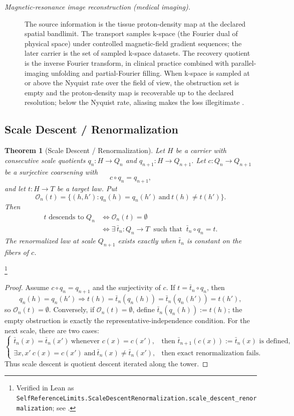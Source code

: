 \documentclass[11pt]{article}
\newtheorem{theorem}{Theorem}[section]
\theoremstyle{definition}
\begin{document}
\begin{description}
\item[\emph{Magnetic-resonance image reconstruction
(medical imaging).}]
The source information is the tissue proton-density
map at the declared spatial bandlimit.  The transport
samples k-space (the Fourier dual of physical space)
under controlled magnetic-field gradient sequences;
the later carrier is the set of sampled k-space
datasets.  The recovery quotient is the inverse
Fourier transform, in clinical practice combined with
parallel-imaging unfolding and partial-Fourier
filling.  When k-space is sampled at or above the
Nyquist rate over the field of view, the obstruction
set is empty and the proton-density map is
recoverable up to the declared resolution; below the
Nyquist rate, aliasing makes the loss illegitimate
\citep{Lauterbur1973MRI}.
\end{description}

\subsection{Scale Descent / Renormalization}\label{sec:self-reference-limits:scale-descent}

\begin{theorem}[Scale Descent / Renormalization]\label{thm:F35}
Let \(H\) be a carrier with consecutive scale quotients
\(q_n:H\to Q_n\) and \(q_{n+1}:H\to Q_{n+1}\). Let
\(c:Q_n\to Q_{n+1}\) be a surjective coarsening with
\[
  c\circ q_n=q_{n+1},
\]
and let \(t:H\to T\) be a target law. Put
\[
  \mathcal O_n(t)=
  \{(h,h'):q_n(h)=q_n(h')\ \text{and}\ t(h)\ne t(h')\}.
\]
Then
\begin{align*}
  t \text{ descends to } Q_n
  &\iff \mathcal O_n(t)=\emptyset\\
  &\iff
  \exists\,\bar t_n:Q_n\to T\ \text{ such that }\
    \bar t_n\circ q_n=t .
\end{align*}
The renormalized law at scale \(Q_{n+1}\) exists exactly when
\(\bar t_n\) is constant on the fibers of \(c\).
\end{theorem}
\footnote{\raggedright Verified in Lean as
\texttt{SelfReferenceLimits.\allowbreak{}ScaleDescentRenormalization.\allowbreak{}scale\_descent\_renormalization};
see \Cref{app:formalization}.}
\begin{proof}
Assume \(c\circ q_n=q_{n+1}\) and the surjectivity of \(c\). If
\(t=\bar t_n\circ q_n\), then
\[
  q_n(h)=q_n(h') \Longrightarrow
  t(h)=\bar t_n(q_n(h))=\bar t_n(q_n(h'))=t(h'),
\]
so \(\mathcal O_n(t)=\emptyset\). Conversely, if
\(\mathcal O_n(t)=\emptyset\), define \(\bar t_n(q_n(h)):=t(h)\);
the empty obstruction is exactly the representative-independence
condition. For the next scale, there are two cases:
\[
  \begin{cases}
  \bar t_n(x)=\bar t_n(x')\ \text{whenever }c(x)=c(x'),
    &\text{then }\bar t_{n+1}(c(x)):=\bar t_n(x)\text{ is defined},\\
  \exists x,x'\ c(x)=c(x')\ \text{and}\ \bar t_n(x)\ne\bar t_n(x'),
    &\text{then exact renormalization fails.}
  \end{cases}
\]
Thus scale descent is quotient descent iterated along the tower.
\end{proof}
\end{document}
